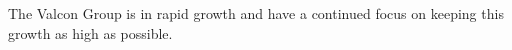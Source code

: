The Valcon Group is in rapid growth and have a continued focus on keeping this growth as high as possible.
